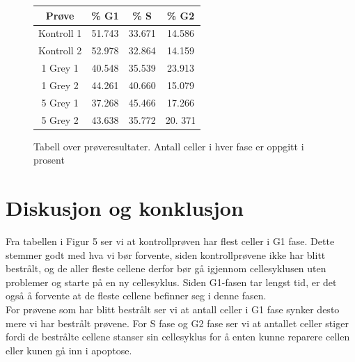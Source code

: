 \documentclass[a4paper, 12pt]{article}
\begin{document}
\begin{figure}[H]
\begin{center}
\begin{tabular}{ |c|c|c|c| }
\hline
Prøve & \% G1 & \%  S &  \% G2\\
\hline
Kontroll 1 & 51.743 & 33.671 & 14.586\\ \hline
Kontroll 2 & 52.978 & 32.864 & 14.159\\\hline
1 Grey 1 & 40.548 & 35.539 & 23.913 \\\hline
1 Grey 2 & 44.261 & 40.660 & 15.079 \\\hline
5 Grey 1 & 37.268 & 45.466 & 17.266 \\\hline
5 Grey 2 & 43.638 & 35.772 & 20. 371 \\
\hline
\end{tabular}
\caption{Tabell over prøveresultater. Antall celler i hver fase er oppgitt i prosent}
\end{center}
\end{figure}
\section{Diskusjon og konklusjon}
Fra tabellen i Figur 5 ser vi at kontrollprøven har flest celler i G1 fase. Dette stemmer godt med hva vi bør forvente, siden kontrollprøvene ikke har blitt bestrålt, og de aller fleste cellene derfor bør gå igjennom cellesyklusen uten problemer og starte på en ny cellesyklus. Siden G1-fasen tar lengst tid, er det også å forvente at de fleste cellene befinner seg i denne fasen.\\
For prøvene som har blitt bestrålt ser vi at antall celler i G1 fase synker desto mere vi har bestrålt prøvene. For S fase og G2 fase ser vi at antallet celler stiger fordi de bestrålte cellene stanser sin cellesyklus for å enten kunne reparere cellen eller kunen gå inn i apoptose.
\end{document}
